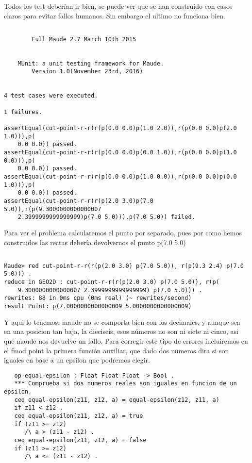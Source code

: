 \documentclass[12pt,a4paper]{book}
\begin{document}
Todos los test deber\'ian ir bien, se puede ver que se han construido con casos claros para evitar fallos humanos. Sin embargo el ultimo no funciona bien.

\begin{verbatim}

	    Full Maude 2.7 March 10th 2015


	MUnit: a unit testing framework for Maude.
		Version 1.0(November 23rd, 2016)


4 test cases were executed.

1 failures.

assertEqual(cut-point-r-r(r(p(0.0 0.0)p(1.0 2.0)),r(p(0.0 0.0)p(2.0 1.0))),p(
    0.0 0.0)) passed.
assertEqual(cut-point-r-r(r(p(0.0 0.0)p(0.0 1.0)),r(p(0.0 0.0)p(1.0 0.0))),p(
    0.0 0.0)) passed.
assertEqual(cut-point-r-r(r(p(0.0 0.0)p(1.0 0.0)),r(p(0.0 0.0)p(0.0 1.0))),p(
    0.0 0.0)) passed.
assertEqual(cut-point-r-r(r(p(2.0 3.0)p(7.0 5.0)),r(p(9.3000000000000007
    2.3999999999999999)p(7.0 5.0))),p(7.0 5.0)) failed.

\end{verbatim}

Para ver el problema calcularemos el punto por separado, pues por como hemos construidos las rectas deber\'ia devolvernos el punto p(7.0 5.0)

\begin{verbatim}

Maude> red cut-point-r-r(r(p(2.0 3.0) p(7.0 5.0)), r(p(9.3 2.4) p(7.0 5.0))) .
reduce in GEO2D : cut-point-r-r(r(p(2.0 3.0) p(7.0 5.0)), r(p(
    9.3000000000000007 2.3999999999999999) p(7.0 5.0))) .
rewrites: 88 in 0ms cpu (0ms real) (~ rewrites/second)
result Point: p(7.0000000000000009 5.0000000000000009)

\end{verbatim}

Y aqui lo tenemos, maude no se comporta bien con los decimales, y aunque sea en una posicion tan baja, la dieciseis, esos n\'umeros no son ni siete ni cinco, asi que maude nos devuelve un fallo.
Para corregir este tipo de errores incluiremos en el fmod point la primera funci\'on auxiliar, que dado dos numeros dira si son iguales en base a un epsilon que podremos elegir.

\begin{verbatim}
   op equal-epsilon : Float Float Float -> Bool .
   *** Comprueba si dos numeros reales son iguales en funcion de un epsilon.
   ceq equal-epsilon(z11, z12, a) = equal-epsilon(z12, z11, a)
   if z11 < z12 .
   ceq equal-epsilon(z11, z12, a) = true
   if (z11 >= z12) 
      /\ a > (z11 - z12) .
   ceq equal-epsilon(z11, z12, a) = false
   if (z11 >= z12) 
      /\ a <= (z11 - z12) .

\end{verbatim}   
\end{document}
